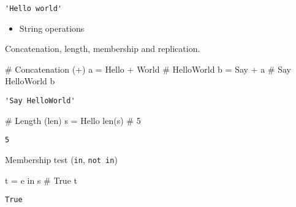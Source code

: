 \documentclass[
  letterpaper,
  DIV=11,
  numbers=noendperiod]{scrreprt}
\newenvironment{Shaded}{\begin{snugshade}}{\end{snugshade}}
\newcommand{\BuiltInTok}[1]{\textcolor[rgb]{0.00,0.46,0.62}{#1}}
\newcommand{\CommentTok}[1]{\textcolor[rgb]{0.37,0.37,0.37}{#1}}
\newcommand{\KeywordTok}[1]{\textcolor[rgb]{0.00,0.46,0.62}{#1}}
\newcommand{\NormalTok}[1]{\textcolor[rgb]{0.00,0.46,0.62}{#1}}
\newcommand{\OperatorTok}[1]{\textcolor[rgb]{0.37,0.37,0.37}{#1}}
\newcommand{\StringTok}[1]{\textcolor[rgb]{0.13,0.47,0.30}{#1}}
\providecommand{\tightlist}{%
  \setlength{\itemsep}{0pt}\setlength{\parskip}{0pt}}
\begin{document}
\begin{verbatim}
'Hello world'
\end{verbatim}

\begin{itemize}
\tightlist
\item
  String operations
\end{itemize}

Concatenation, length, membership and replication.

\begin{Shaded}
\begin{Highlighting}[]
\CommentTok{\# Concatenation (+)}
\NormalTok{a }\OperatorTok{=} \StringTok{\textquotesingle{}Hello\textquotesingle{}} \OperatorTok{+} \StringTok{\textquotesingle{}World\textquotesingle{}}   \CommentTok{\# \textquotesingle{}HelloWorld\textquotesingle{}}
\NormalTok{b }\OperatorTok{=} \StringTok{\textquotesingle{}Say \textquotesingle{}} \OperatorTok{+}\NormalTok{ a          }\CommentTok{\# \textquotesingle{}Say HelloWorld\textquotesingle{}}
\NormalTok{b}
\end{Highlighting}
\end{Shaded}

\begin{verbatim}
'Say HelloWorld'
\end{verbatim}

\begin{Shaded}
\begin{Highlighting}[]
\CommentTok{\# Length (len)}
\NormalTok{s }\OperatorTok{=} \StringTok{\textquotesingle{}Hello\textquotesingle{}}
\BuiltInTok{len}\NormalTok{(s)                  }\CommentTok{\# 5}
\end{Highlighting}
\end{Shaded}

\begin{verbatim}
5
\end{verbatim}

Membership test (\texttt{in}, \texttt{not\ in})

\begin{Shaded}
\begin{Highlighting}[]
\NormalTok{t }\OperatorTok{=} \StringTok{\textquotesingle{}e\textquotesingle{}} \KeywordTok{in}\NormalTok{ s            }\CommentTok{\# True}
\NormalTok{t}
\end{Highlighting}
\end{Shaded}

\begin{verbatim}
True
\end{verbatim}
\end{document}
